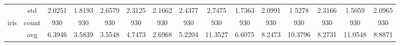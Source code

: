 \begin{table}[htbp]
{\begin{tabular}{rcccc|c|c|c|c|c|ccccc}
			                                                                               & std                                    & 2.0251                                                                             & 1.8193                                                                    & 2.6579                                                                    & 2.3125                                         & 2.1662                                                                    & 2.4377                                       & 2.7475                                      & 1.7363                                         & 2.0991                                         & 1.5278                                          & 2.3166                                          & 1.5059                                         & 2.0965                                         \\
			iris                                                                           & count                                  & 930                                                                                & 930                                                                       & 930                                                                       & 930                                            & 930                                                                       & 930                                          & 930                                         & 930                                            & 930                                            & 930                                             & 930                                             & 930                                            & 930                                            \\
			                                                                               & avg                                    & 6.3946                                                                             & 3.5839                                                                    & 3.5548                                                                    & 4.7473                                         & \cellcolor[rgb]{ .776,  .937,  .808}\textcolor[rgb]{ 0,  .38,  0}{2.6968} & 5.2204                                       & 11.3527                                     & 6.6075                                         & 8.2473                                         & 10.3796                                         & 8.2731                                          & 11.0548                                        & 8.8871                                         \\

\end{tabular}}
\end{table}
